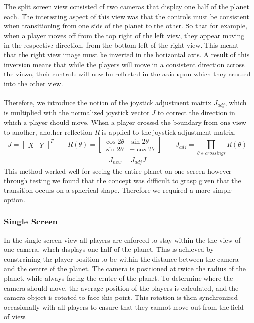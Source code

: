 \documentclass[11pt,a4paper]{article}
\begin{document}
   The split screen view consisted of two cameras that display one half of the planet each. The interesting aspect of this view was that the controls must be consistent when transitioning from one side of the planet to the other. So that for example, when a player moves off from the top right of the left view, they appear moving in the respective direction, from the bottom left of the right view. This meant that the right view image must be inverted in the horizontal axis. A result of this inversion means that while the players will move in a consistent direction across the views, their controls will now be reflected in the axis upon which they crossed into the other view. \\ \\
   Therefore, we introduce the notion of the joystick adjustment matrix $J_{adj}$, which is multiplied with the normalized joystick vector $J$ to correct the direction in which a player should move. When a player crossed the boundary from one view to another, another reflection $R$ is applied to the joystick adjustment matrix. 
  \begin{equation}
     J=\begin{bmatrix}
         X & Y
        \end{bmatrix}^{T}
        \qquad
          R(\theta) = 
          \begin{bmatrix}
          \cos {2\theta} & \sin {2\theta} \\
          \sin {2\theta} & -\cos {2\theta}
          \end{bmatrix}
      \qquad
      J_{adj} = \prod_{\theta \in crossings}R({\theta})
  \end{equation}
  \begin{align*}
    J_{new} = J_{adj}J
  \end{align*}
  This method worked well for seeing the entire planet on one screen however through testing we found that the concept was difficult to grasp given that the transition occurs on a spherical shape. Therefore we required a more simple option.

\pagebreak
   \subsubsection{Single Screen}
    In the single screen view all players are enforced to stay within the the view of one camera, which displays one half of the planet. This is achieved by constraining the player position to be within the distance between the camera and the centre of the planet. The camera is positioned at twice the radius of the planet, while always facing the centre of the planet. To determine where the camera should move, the average position of the players is calculated, and the camera object is rotated to face this point. This rotation is then synchronized occasionally with all players to ensure that they cannot move out from the field of view. \\ \\
\end{document}

